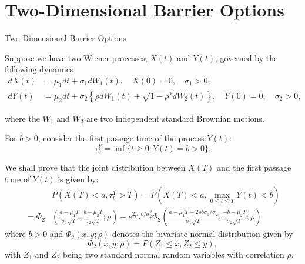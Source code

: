 \documentclass{beamer}
\begin{document}
\section{Two-Dimensional Barrier Options}
\begin{frame}{Two-Dimensional Barrier Options}
    
    {\footnotesize \footnotesize
    \par Suppose we have two Wiener processes, \( X(t) \) and \( Y(t) \), governed by the following dynamics
    \begin{align*}
    dX(t) &= \mu_1 dt + \sigma_1 dW_1(t), \quad X(0) = 0, \quad \sigma_1 > 0, \\
    dY(t) &= \mu_2 dt + \sigma_2 \left\{ \rho dW_1(t) + \sqrt{1 - \rho^2} dW_2(t) \right\}, \quad Y(0) = 0, \quad \sigma_2 > 0,
    \end{align*}
    \par where the \( W_1 \) and \( W_2 \) are two independent standard Brownian motions.
    \par For \( b > 0 \), consider the first passage time of the process \( Y(t) \):
    \[
    \tau_b^Y = \inf\{t \geq 0: Y(t) = b > 0\}.
    \]
    \par We shall prove that the joint distribution between \( X(T) \) and the first passage time of \( Y(t) \) is given by:
    \vspace{-1em}
    \begin{align*}
    &P(X(T) < a, \tau_b^Y > T) = P\left(X(T) < a, \max_{0 \leq t \leq T} Y(t) < b\right) \\
    = \Phi_2 & \left( \frac{a - \mu_1 T}{\sigma_1 \sqrt{T}}, \frac{b - \mu_2 T}{\sigma_2 \sqrt{T}} ; \rho \right) - 
    e^{2 \mu_2 b / \sigma_2^2} \Phi_2 \left( \frac{a - \mu_1 T - 2 \rho b \sigma_1 / \sigma_2}{\sigma_1 \sqrt{T}}, \frac{-b - \mu_2 T}{\sigma_2 \sqrt{T}} ; \rho \right)
    \end{align*}
    where $b > 0$ and \( \Phi_2(x, y; \rho) \) denotes the bivariate normal distribution given by
    \[
    \Phi_2(x, y; \rho) = P(Z_1 \leq x, Z_2 \leq y),
    \]
    with \( Z_1 \) and \( Z_2 \) being two standard normal random variables with correlation \( \rho \).
    \vspace{1em}

    }

\end{frame}
\end{document}

